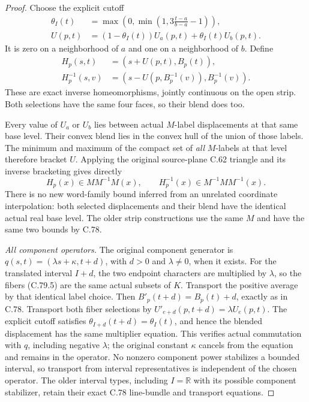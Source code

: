 \begin{proof}
Choose the explicit cutoff
\[
 \begin{split}
 \theta_I(t)&=\max\left(0,
          \min\left(1,3\frac{t-a}{b-a}-1\right)\right),\\
 U(p,t)&=(1-\theta_I(t))U_a(p,t)+\theta_I(t)U_b(p,t).
 \end{split}
                                                               \tag{C.79.10}
\]
It is zero on a neighborhood of $a$ and
one on a neighborhood of $b$. Define
\[
 \begin{split}
 H_p(s,t)&=(s+U(p,t),B_p(t)),\\
 H_p^{-1}(s,v)&=
        (s-U(p,B_p^{-1}(v)),B_p^{-1}(v)).
 \end{split}                                                   \tag{C.79.11}
\]
These are exact inverse homeomorphisms,
jointly continuous on the open strip.
Both selections have the same four faces,
so their blend does too.

Every value of $U_a$ or $U_b$ lies between
actual $M$-label displacements at that same
base level. Their convex blend lies in the
convex hull of the union of those labels.
The minimum and maximum of the compact
set of \emph{all} $M$-labels at that level
therefore bracket $U$. Applying the original
source-plane C.62 triangle and its inverse
bracketing gives directly
\[
           H_p(x)\in M M^{-1}M(x),\qquad
           H_p^{-1}(x)\in M^{-1}M M^{-1}(x).
                                                               \tag{C.79.12}
\]
There is no new word-family bound inferred
from an unrelated coordinate interpolation:
both selected displacements and their blend
have the identical actual real base level.
The older strip constructions use the same
$M$ and have the same two bounds by C.78.

\emph{All component operators.}
The original component generator is
$q(s,t)=(\lambda s+\kappa,t+d)$, with
$d>0$ and $\lambda\ne0$, when it exists.
For the translated interval $I+d$, the
two endpoint characters are multiplied by
$\lambda$, so the fibers (C.79.5) are the
same actual subsets of $K$. Transport the
positive average by that identical label
choice. Then $B'_p(t+d)=B_p(t)+d$, exactly
as in C.78. Transport both fiber selections
by $U'_{e+d}(p,t+d)=\lambda U_e(p,t)$.
The explicit cutoff satisfies
$\theta_{I+d}(t+d)=\theta_I(t)$, and hence
the blended displacement has the same
multiplier equation. This verifies actual
commutation with $q$, including negative
$\lambda$; the original constant $\kappa$
cancels from the equation and remains in
the operator. No nonzero component power
stabilizes a bounded interval, so transport
from interval representatives is independent
of the chosen operator. The older interval
types, including $I=\mathbb R$ with its
possible component stabilizer, retain their
exact C.78 line-bundle and transport equations.


\end{proof}
